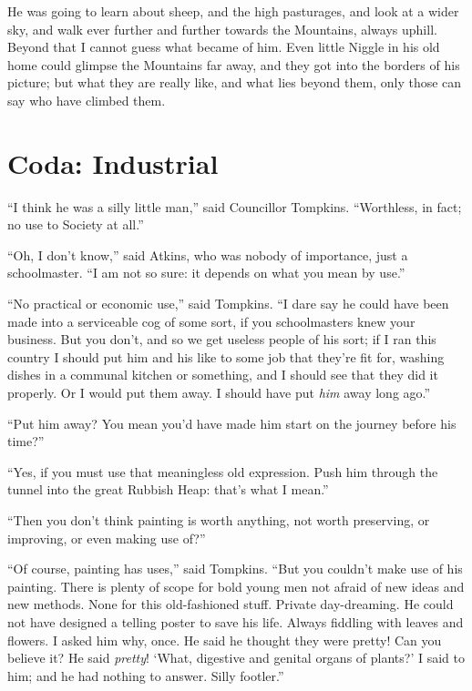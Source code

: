 He was going to learn about sheep, and the high pasturages, and look at a wider sky, and walk ever further and further towards the Mountains, always uphill. Beyond that I cannot guess what became of him. Even little Niggle in his old home could glimpse the Mountains far away, and they got into the borders of his picture; but what they are really like, and what lies beyond them, only those can say who have climbed them.

\onlyscore{\pagebreak\enlargethispage{\baselineskip}}
\section*{Coda: Industrial}

“I think he was a silly little man,” said Councillor Tompkins. “Worthless, in fact; no use to Society at all.”

“Oh, I don’t know,” said Atkins, who was nobody of importance, just a schoolmaster. “I am not so sure: it depends on what you mean by use.”

“No practical or economic use,” said Tompkins. “I dare say he could have been made into a serviceable cog of some sort, if you schoolmasters knew your business. But you don’t, and so we get useless people of his sort; if I ran this country I should put him and his like to some job that they’re fit for, washing dishes in a communal kitchen or something, and I should see that they did it properly. Or I would put them away. I should have put \emph{him} away long ago.”

“Put him away? You mean you’d have made him start on the journey before his time?”

“Yes, if you must use that meaningless old expression. Push him through the tunnel into the great Rubbish Heap: that’s what I mean.”

“Then you don’t think painting is worth anything, not worth preserving, or improving, or even making use of?”

“Of course, painting has uses,” said Tompkins. “But you couldn’t make use of his painting. There is plenty of scope for bold young men not afraid of new ideas and new methods. None for this old-fashioned stuff. Private day-dreaming. He could not have designed a telling poster to save his life. Always fiddling with leaves and flowers. I asked him why, once. He said he thought they were pretty! Can you believe it? He said \emph{pretty}! ‘What, digestive and genital organs of plants?’ I said to him; and he had nothing to answer. Silly footler.”

